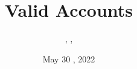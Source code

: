 \documentclass{../../../extra/styles/SecureRole}
\title{Valid Accounts}
\author{\Ba, \Wi, \Zm}
\date{May 30 , 2022}
\begin{document}
\makecover 

\tableofcontents

\newpage


\end{document}
